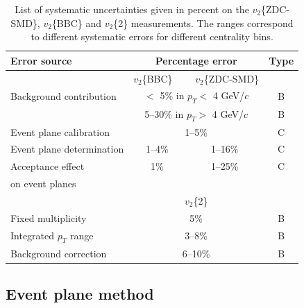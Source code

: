 \documentclass[aps,prc,superscriptaddress,showpacs,floatfix,twocolumn]{revtex4}
\newcommand \gevc{GeV/$c$\xspace}
\newcommand \pt{\mbox{$p_T$}\xspace}
\begin{document}
\begin{table}[htbp]
\caption{\label{tab:summary_systematicerror_eventplane} 
List of systematic uncertainties given in percent on the $v_2$\{ZDC-SMD\}, $v_2$\{BBC\} and $v_2$\{2\} 
measurements. The ranges correspond to different systematic errors for different centrality bins.
}
\begin{ruledtabular} \begin{tabular}{lccc}
Error source              & \multicolumn{2}{c}{Percentage error}          &Type\\ \hline
                          & $v_2$\{BBC\} \  &  \ $v_2$\{ZDC-SMD\}         &    \\ \hline
Background contribution   & \multicolumn{2}{c}{$<$ 5\% in \pt $<$ 4 \gevc}& B  \\
	                          & \multicolumn{2}{c}{5--30\% in \pt $>$ 4 \gevc} & B  \\
Event plane calibration   & \multicolumn{2}{c}{1--5\%}                     & C  \\
Event plane determination &  1--4\%        & 1--16\%                        & C  \\
Acceptance effect         &  1\%          & 1--25\%                        & C  \\ 
on event planes           &               &                               &    \\ \hline
                          & \multicolumn{2}{c}{$v_2$\{2\}}                &    \\ \hline
Fixed multiplicity        & \multicolumn{2}{c}{ 5\%}                      & B  \\
Integrated \pt range      & \multicolumn{2}{c}{ 3--8\%}                    & B  \\
Background correction     & \multicolumn{2}{c}{ 6--10\%}                   & B  \\
\end{tabular} \end{ruledtabular}
\end{table}

\subsection{Event plane method \label{subsec:syserror_eventplanemethod}}
\end{document}

